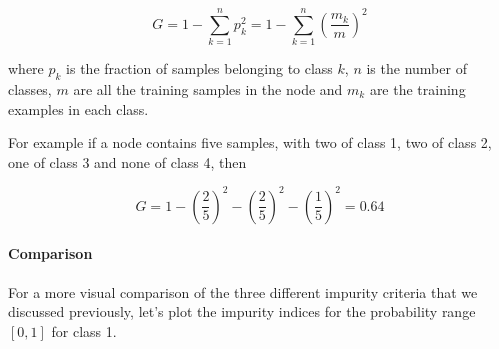 \documentclass[11pt]{article}
\begin{document}
    \begin{equation}
G = 1 - \sum\limits_{k=1}^n p_k^2 = 1 - \sum\limits_{k=1}^n \left( \frac{m_k}{m} \right)^2 
\end{equation}

where \(p_k\) is the fraction of samples belonging to class \(k\), \(n\)
is the number of classes, \(m\) are all the training samples in the node
and \(m_k\) are the training examples in each class.

For example if a node contains five samples, with two of class 1, two of
class 2, one of class 3 and none of class 4, then

\[G = 1 - \left( \frac{2}{5} \right)^2 - \left( \frac{2}{5} \right)^2  - \left( \frac{1}{5} \right)^2  = 0.64\]

    \hypertarget{comparison}{%
\paragraph{Comparison}\label{comparison}}

For a more visual comparison of the three different impurity criteria
that we discussed previously, let's plot the impurity indices for the
probability range \([0, 1]\) for class 1.
\end{document}
